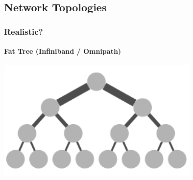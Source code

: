 \documentclass[xcolor={rgb,x11names,svgnames},rgb,x11names,svgnames]{beamer}
\begin{document}
\subsection{Network Topologies}


\begin{frame}
  \frametitle{Realistic?}
  \framesubtitle{Fat Tree (Infiniband / Omnipath)}

  \centering
  \includegraphics[width=10cm]{fat_tree.pdf}
\end{frame}

\end{document}
